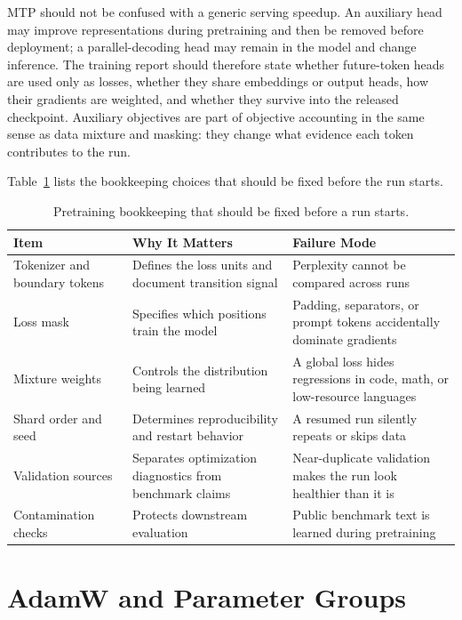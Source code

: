 MTP should not be confused with a generic serving speedup. An auxiliary head may improve representations during pretraining and then be removed before deployment; a parallel-decoding head may remain in the model and change inference. The training report should therefore state whether future-token heads are used only as losses, whether they share embeddings or output heads, how their gradients are weighted, and whether they survive into the released checkpoint. Auxiliary objectives are part of objective accounting in the same sense as data mixture and masking: they change what evidence each token contributes to the run.

Table~\ref{tab:pretraining-bookkeeping} lists the bookkeeping choices that should be fixed before the run starts.

\begin{table}[t]
\caption{Pretraining bookkeeping that should be fixed before a run starts.}
\label{tab:pretraining-bookkeeping}
\small
\begin{tabular}{@{}p{2.8cm}p{5.0cm}p{4.1cm}@{}}
\toprule
Item & Why It Matters & Failure Mode \\
\midrule
Tokenizer and boundary tokens & Defines the loss units and document transition signal & Perplexity cannot be compared across runs \\
Loss mask & Specifies which positions train the model & Padding, separators, or prompt tokens accidentally dominate gradients \\
Mixture weights & Controls the distribution being learned & A global loss hides regressions in code, math, or low-resource languages \\
Shard order and seed & Determines reproducibility and restart behavior & A resumed run silently repeats or skips data \\
Validation sources & Separates optimization diagnostics from benchmark claims & Near-duplicate validation makes the run look healthier than it is \\
Contamination checks & Protects downstream evaluation & Public benchmark text is learned during pretraining \\
\bottomrule
\end{tabular}
\end{table}

\section{AdamW and Parameter Groups}
\label{sec:adamw-parameter-groups}

